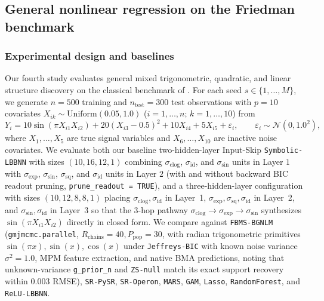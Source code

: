 \documentclass[11pt,a4paper]{article}
\begin{document}
\subsection{General nonlinear regression on the Friedman benchmark}
\label{sec:exp:nonlinear}

\subsubsection{Experimental design and baselines}
Our fourth study evaluates general mixed trigonometric, quadratic, and linear structure discovery on the classical benchmark of \citet{friedman1991multivariate}. For each seed $s \in \{1, \dots, M\}$, we generate $n = 500$ training and $n_{\text{test}} = 300$ test observations with $p = 10$ covariates $X_{ik} \sim \mathrm{Uniform}(0.05, 1.0)$ ($i = 1, \dots, n$; $k = 1, \dots, 10$) from
\begin{equation}
\label{eq:dgp_friedman}
Y_i = 10\sin(\pi X_{i1} X_{i2}) + 20(X_{i3} - 0.5)^2 + 10 X_{i4} + 5 X_{i5} + \varepsilon_i, \qquad \varepsilon_i \sim \mathcal{N}(0, 1.0^2),
\end{equation}
where $X_1, \dots, X_5$ are true signal variables and $X_6, \dots, X_{10}$ are inactive noise covariates. We evaluate both our baseline two-hidden-layer Input-Skip \texttt{Symbolic-LBBNN} with sizes $(10, 16, 12, 1)$ combining $\sigma_{\text{clog}}$, $\sigma_{\text{id}}$, and $\sigma_{\sin}$ units in Layer $1$ with $\sigma_{\exp}$, $\sigma_{\sin}$, $\sigma_{\text{sq}}$, and $\sigma_{\text{id}}$ units in Layer $2$ (with and without backward BIC readout pruning, \texttt{prune\_readout = TRUE}), and a three-hidden-layer configuration with sizes $(10, 12, 8, 8, 1)$ placing $\sigma_{\text{clog}}, \sigma_{\text{id}}$ in Layer~1, $\sigma_{\exp}, \sigma_{\text{sq}}, \sigma_{\text{id}}$ in Layer~2, and $\sigma_{\sin}, \sigma_{\text{id}}$ in Layer~3 so that the 3-hop pathway $\sigma_{\text{clog}} \to \sigma_{\exp} \to \sigma_{\sin}$ synthesizes $\sin(\pi X_{i1} X_{i2})$ directly in closed form. We compare against \texttt{FBMS-BGNLM} (\texttt{gmjmcmc.parallel}, $R_{\text{chains}}=40, P_{\text{pop}}=30$, with radian trigonometric primitives $\sin(\pi x), \sin(x), \cos(x)$ under \texttt{Jeffreys-BIC} with known noise variance $\sigma^2 = 1.0$, MPM feature extraction, and native BMA predictions, noting that unknown-variance \texttt{g\_prior\_n} and \texttt{ZS-null} match its exact support recovery within $0.003$ RMSE), \texttt{SR-PySR}, \texttt{SR-Operon}, \texttt{MARS}, \texttt{GAM}, \texttt{Lasso}, \texttt{RandomForest}, and \texttt{ReLU-LBBNN}.
\end{document}
